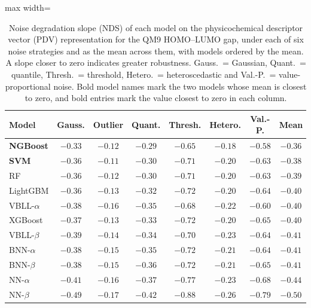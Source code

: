 \begin{table}[htbp]
\centering
\caption[Noise degradation slope by model on PDV for QM9.]{Noise degradation slope (NDS) of each model on the physicochemical descriptor vector (PDV) representation for the QM9 HOMO--LUMO gap, under each of six noise strategies and as the mean across them, with models ordered by the mean. A slope closer to zero indicates greater robustness. Gauss.\ = Gaussian, Quant.\ = quantile, Thresh.\ = threshold, Hetero.\ = heteroscedastic and Val.-P.\ = value-proportional noise. Bold model names mark the two models whose mean is closest to zero, and bold entries mark the value closest to zero in each column.}
\label{tab:nds_ranking}
\small
\begin{adjustbox}{max width=\textwidth}
\begin{tabular}{lccccccc}
\toprule
\textbf{Model} & \textbf{Gauss.} & \textbf{Outlier} & \textbf{Quant.} & \textbf{Thresh.} & \textbf{Hetero.} & \textbf{Val.-P.} & \textbf{Mean} \\
\midrule
\textbf{NGBoost}    & $\mathbf{-0.33}$ & $-0.12$ & $\mathbf{-0.29}$ & $\mathbf{-0.65}$ & $\mathbf{-0.18}$ & $\mathbf{-0.58}$ & $\mathbf{-0.36}$ \\
\textbf{SVM}        & $-0.36$ & $\mathbf{-0.11}$ & $-0.30$ & $-0.71$ & $-0.20$ & $-0.63$ & $-0.38$ \\
RF                  & $-0.36$ & $-0.12$ & $-0.30$ & $-0.71$ & $-0.20$ & $-0.63$ & $-0.39$ \\
LightGBM            & $-0.36$ & $-0.13$ & $-0.32$ & $-0.72$ & $-0.20$ & $-0.64$ & $-0.40$ \\
VBLL-$\alpha$       & $-0.38$ & $-0.16$ & $-0.35$ & $-0.68$ & $-0.22$ & $-0.60$ & $-0.40$ \\
XGBoost             & $-0.37$ & $-0.13$ & $-0.33$ & $-0.72$ & $-0.20$ & $-0.65$ & $-0.40$ \\
VBLL-$\beta$        & $-0.39$ & $-0.14$ & $-0.34$ & $-0.70$ & $-0.23$ & $-0.64$ & $-0.41$ \\
BNN-$\alpha$        & $-0.38$ & $-0.15$ & $-0.35$ & $-0.72$ & $-0.21$ & $-0.64$ & $-0.41$ \\
BNN-$\beta$         & $-0.38$ & $-0.15$ & $-0.36$ & $-0.72$ & $-0.21$ & $-0.65$ & $-0.41$ \\
NN-$\alpha$         & $-0.41$ & $-0.16$ & $-0.37$ & $-0.77$ & $-0.23$ & $-0.68$ & $-0.44$ \\
NN-$\beta$          & $-0.49$ & $-0.17$ & $-0.42$ & $-0.88$ & $-0.26$ & $-0.79$ & $-0.50$ \\
\bottomrule
\end{tabular}
\end{adjustbox}
\end{table}

